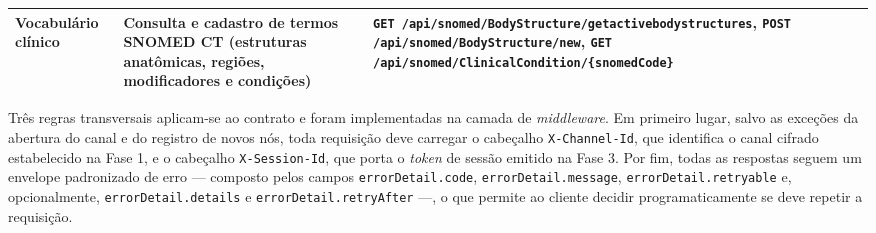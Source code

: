 \begin{tabframed}[htpb]
\begin{tabular}{|p{}|p{}|p{}|}
\textbf{Vocabulário clínico} & Consulta e cadastro de termos SNOMED CT (estruturas anatômicas, regiões, modificadores e condições) & \texttt{GET /api/snomed/BodyStructure\newline    /getactivebodystructures}, \newline\texttt{POST /api/snomed/BodyStructure/new}, \newline\texttt{GET /api/snomed/ClinicalCondition/\newline\{snomedCode\}} \\ \hline
\end{tabular}
\fonte{}
\end{tabframed}

Três regras transversais aplicam-se ao contrato e foram implementadas na camada de \textit{middleware}. Em primeiro lugar, salvo as exceções da abertura do canal e do registro de novos nós, toda requisição deve carregar o cabeçalho \texttt{X-Channel-Id}, que identifica o canal cifrado estabelecido na Fase 1, e o cabeçalho \texttt{X-Session-Id}, que porta o \textit{token} de sessão emitido na Fase 3. Por fim, todas as respostas seguem um envelope padronizado de erro --- composto pelos campos \texttt{errorDetail.code}, \texttt{errorDetail.message}, \texttt{errorDetail.retryable} e, opcionalmente, \texttt{errorDetail.details} e \texttt{errorDetail.retryAfter} ---, o que permite ao cliente decidir programaticamente se deve repetir a requisição.

